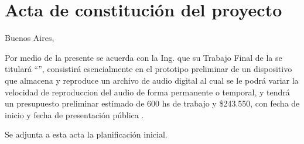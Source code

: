\documentclass[11pt]{charter}
\begin{document}
\pagebreak



\section{Acta de constitución del proyecto}
\label{sec:acta}

\begin{flushright}
Buenos Aires, \fechaInicioName
\end{flushright}

\vspace{2cm}

Por medio de la presente se acuerda con la Ing. \authorname\hspace{1px} que su Trabajo Final de la \degreename\hspace{1px} se titulará ``\ttitle'', consistirá esencialmente en el prototipo preliminar de un dispositivo que almacena y reproduce un archivo de audio digital al cual se le podrá variar la velocidad de reproduccion del audio de forma permanente o temporal, y tendrá un presupuesto preliminar estimado de 600 hs de trabajo y \$243.550, con fecha de inicio \fechaInicioName\hspace{1px} y fecha de presentación pública \fechaFinalName.

Se adjunta a esta acta la planificación inicial.

\vfill
\end{document}
